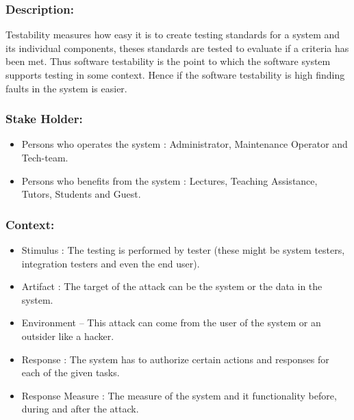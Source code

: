 \documentclass[11pt]{article}
\begin{document}
		\subsubsection{Description:}
			\textbf{}Testability measures how easy it is to create testing standards for a system and its individual components, theses standards are tested to evaluate if a criteria has been met. Thus software testability is the point to which the software system supports testing in some context. Hence if the software testability is high finding faults in the system is easier.
		
		\subsubsection{Stake Holder:}
		\begin{itemize}
			\item Persons who operates the system : Administrator, Maintenance Operator and Tech-team.
			\item Persons who benefits from the system : Lectures, Teaching Assistance, Tutors, Students and Guest.
			\end{itemize}
		\subsubsection{Context:}
		\begin{itemize}
			\item Stimulus : The testing is performed by tester (these might be system testers, integration testers and even the end user).
			\item Artifact : The target of the attack can be the system or the data in the system.
			\item Environment – This attack can come from the user of the system or an outsider like a hacker. 
			\item Response : The system has to authorize certain actions and responses for each of the given tasks.
			\item Response Measure : The measure of the system and it functionality before, during and after the attack.
		\end{itemize}
		
		
\end{document}
